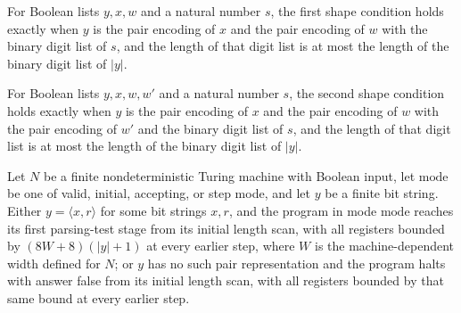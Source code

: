 \begin{definition}
\label{Complexity.Codec.Shape1}
\leanok
{}
For Boolean lists $y,x,w$ and a natural number $s$, the first shape condition holds
exactly when $y$ is the pair encoding of $x$ and the pair encoding of $w$ with the
binary digit list of $s$, and the length of that digit list is at most the length of the
binary digit list of $|y|$.
\end{definition}

\begin{definition}
\label{Complexity.Codec.Shape2}
\leanok
{}
For Boolean lists $y,x,w,w'$ and a natural number $s$, the second shape condition holds
exactly when $y$ is the pair encoding of $x$ and the pair encoding of $w$ with the pair
encoding of $w'$ and the binary digit list of $s$, and the length of that digit list is
at most the length of the binary digit list of $|y|$.
\end{definition}

\begin{theorem}
\label{Complexity.Codec.parse_x}
\leanok
{}
Let $N$ be a finite nondeterministic Turing machine with Boolean input, let
$\mathrm{mode}$ be one of valid, initial, accepting, or step mode, and let $y$ be a
finite bit string. Either $y=\langle x,r\rangle$ for some bit strings $x,r$, and the
program in mode $\mathrm{mode}$ reaches its first parsing-test stage from its initial
length scan, with all registers bounded by $(8W+8)(|y|+1)$ at every earlier step, where
$W$ is the machine-dependent width defined for $N$; or $y$ has no such pair
representation and the program halts with answer false from its initial length scan,
with all registers bounded by that same bound at every earlier step.
\end{theorem}


